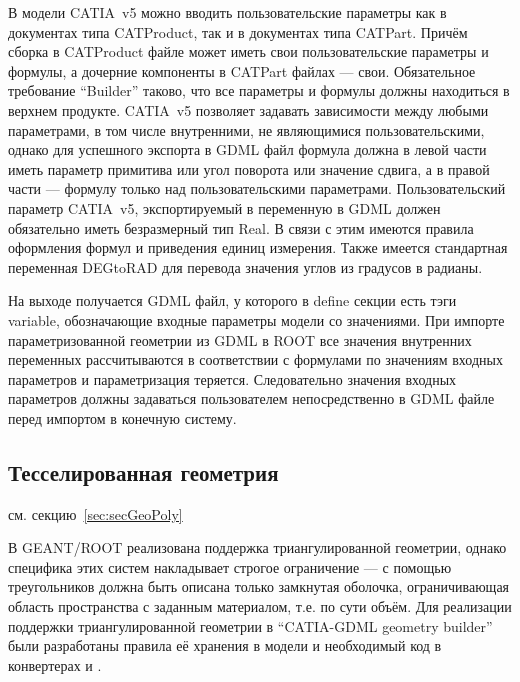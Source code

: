 В модели CATIA~v5 можно вводить пользовательские параметры как в документах типа CATProduct, так и в документах типа CATPart. Причём сборка в CATProduct файле может иметь свои пользовательские параметры и формулы, а дочерние компоненты в CATPart файлах --- свои. Обязательное требование ``Builder'' таково, что все параметры и формулы должны находиться в верхнем продукте. CATIA~v5 позволяет задавать зависимости между любыми параметрами, в том числе внутренними, не являющимися пользовательскими, однако для успешного экспорта в GDML файл формула должна в левой части иметь параметр примитива или угол поворота или значение сдвига, а в правой части --- формулу только над пользовательскими параметрами. Пользовательский параметр CATIA~v5, экспортируемый в переменную в GDML должен обязательно иметь безразмерный тип Real. В связи с этим имеются правила оформления формул и приведения единиц измерения. Также имеется стандартная переменная DEGtoRAD для перевода значения углов из градусов в радианы.

На выходе получается GDML файл, у которого в define секции есть тэги variable, обозначающие входные параметры модели со значениями. При импорте параметризованной геометрии из GDML в ROOT все значения внутренних переменных рассчитываются в соответствии с формулами по значениям входных параметров и параметризация теряется. Следовательно значения входных параметров должны задаваться пользователем непосредственно в GDML файле перед импортом в конечную систему.

%                                               

\subsection{Тесселированная геометрия}\label{sec:Tesselated}

\todo см. секцию~\ref{sec:secGeoPoly}

В GEANT/ROOT реализована поддержка триангулированной геометрии, однако специфика этих систем накладывает строгое ограничение --- с помощью треугольников должна быть описана только замкнутая оболочка, ограничивающая область пространства с заданным материалом, т.е. по сути объём.
Для реализации поддержки триангулированной геометрии в ``CATIA-GDML geometry builder'' были разработаны правила её хранения в модели и необходимый код в конвертерах  и .

